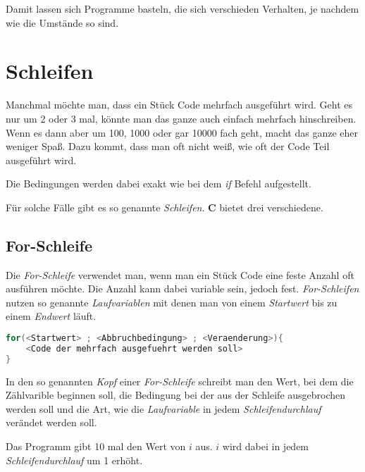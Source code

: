 \documentclass[c_worksheet.tex]{subfiles}
\begin{document}
Damit lassen sich Programme basteln, die sich verschieden Verhalten, je nachdem wie die Umstände so sind.





\section{Schleifen} 

Manchmal möchte man, dass ein Stück Code mehrfach ausgeführt wird. Geht es nur um 2 oder 3 mal, könnte man das ganze auch einfach mehrfach hinschreiben. Wenn es dann aber um 100, 1000 oder gar 10000 fach geht, macht das ganze eher weniger Spaß. Dazu kommt, dass man oft nicht weiß, wie oft der Code Teil ausgeführt wird.

Die Bedingungen werden dabei exakt wie bei dem \emph{if} Befehl aufgestellt.

Für solche Fälle gibt es so genannte \emph{Schleifen}. \textbf{C} bietet drei verschiedene.

\subsection{For-Schleife}

Die \emph{For-Schleife} verwendet man, wenn man ein Stück Code eine feste Anzahl oft ausführen möchte. Die Anzahl kann dabei variable sein, jedoch fest. \emph{For-Schleifen} nutzen so genannte \emph{Laufvariablen} mit denen man von einem \emph{Startwert} bis zu einem \emph{Endwert} läuft.

\begin{lstlisting}[language=c]
for(<Startwert> ; <Abbruchbedingung> ; <Veraenderung>){
	<Code der mehrfach ausgefuehrt werden soll>
}
\end{lstlisting}

In den so genannten \emph{Kopf} einer \emph{For-Schleife} schreibt man den Wert, bei dem die Zählvarible beginnen soll, die Bedingung bei der aus der Schleife ausgebrochen werden soll und die Art, wie die \emph{Laufvariable} in jedem \emph{Schleifendurchlauf} verändet werden soll.

 

Das Programm gibt 10 mal den Wert von \(i\) aus. \(i\) wird dabei in jedem \emph{Schleifendurchlauf} um 1 erhöht.

 
\end{document}
